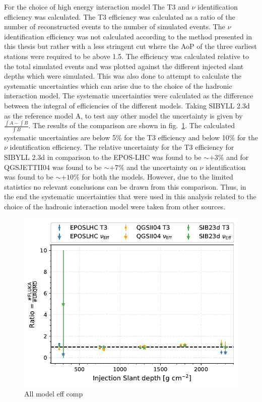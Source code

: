 For the choice of high energy interaction model The T3 and $\nu$ identification efficiency was calculated. The T3 efficiency was calculated as a ratio of the number of reconstructed events to the number of simulated events. The $\nu$ identification efficiency was not calculated according to the method presented in this thesis but rather with a less stringent cut where the AoP of the three earliest stations were required to be above 1.5. The efficiency was calculated relative to the total simulated events and was plotted against the different injected slant depths which were simulated. This was also done to attempt to calculate the systematic uncertainties which can arise due to the choice of the hadronic interaction model. The systematic uncertainties were calculated as the difference between the integral of efficiencies of the different models. Taking SIBYLL 2.3d as the reference model A, to test any other model the uncertainty is given by $\frac{\int A - \int B}{\int B}$. The results of the comparison are shown in fig.~\ref{fig:Eff_vs_slant_comp_all_HModels}. The calculated systematic uncertainties are below 5\% for the T3 efficiency and below 10\% for the $\nu$ identification efficiency. The relative uncertainty for the T3 efficiency for SIBYLL 2.3d in comparison to the EPOS-LHC was found to be $\sim +3\%$ and for QGSJETTII04 was found to be $\sim + 7\%$ and the uncertainty on $\nu$ identification was found to be $\sim +10\%$ for both the models. However, due to the limited statistics no relevant conclusions can be drawn from this comparison. Thus, in the end the systematic uncertainties that were used in this analysis related to the choice of the hadronic interaction model were taken from other sources.  

\begin{figure}[h!]
  \centering
  \includegraphics[width=\textwidth]{thesis_figures/App2/Efficiency_vs_slant_comp_FLUKAnURQMD.pdf}
  \caption{All model eff comp}
  \label{fig:Eff_vs_slant_comp_all_HModels}
\end{figure}

